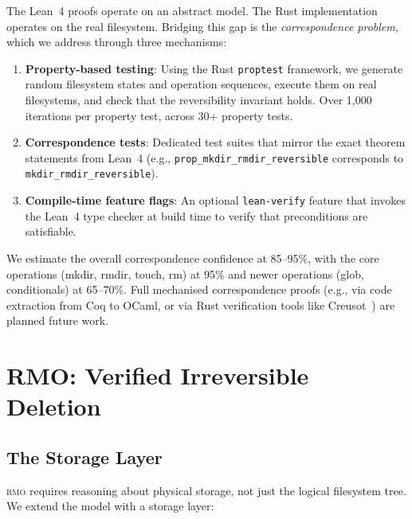 \documentclass[11pt,a4paper]{article}
\newcommand{\rmo}{\textsc{rmo}}
\newcommand{\lean}{Lean~4}
\begin{document}
The \lean{} proofs operate on an abstract model. The Rust implementation
operates on the real filesystem. Bridging this gap is the
\emph{correspondence problem}, which we address through three mechanisms:

\begin{enumerate}
  \item \textbf{Property-based testing}: Using the Rust \texttt{proptest}
        framework, we generate random filesystem states and operation sequences,
        execute them on real filesystems, and check that the reversibility
        invariant holds. Over 1,000 iterations per property test, across 30+
        property tests.

  \item \textbf{Correspondence tests}: Dedicated test suites that mirror the
        exact theorem statements from \lean{} (e.g.,
        \texttt{prop\_mkdir\_rmdir\_reversible} corresponds to
        \texttt{mkdir\_rmdir\_reversible}).

  \item \textbf{Compile-time feature flags}: An optional \texttt{lean-verify}
        feature that invokes the \lean{} type checker at build time to verify
        that preconditions are satisfiable.
\end{enumerate}

We estimate the overall correspondence confidence at 85--95\%, with the core
operations (mkdir, rmdir, touch, rm) at 95\% and newer operations (glob,
conditionals) at 65--70\%. Full mechanised correspondence proofs (e.g., via
code extraction from Coq to OCaml, or via Rust verification tools like
Creusot~\citep{denis2022}) are planned future work.

\section{RMO: Verified Irreversible Deletion}
\label{sec:rmo}

\subsection{The Storage Layer}

\rmo{} requires reasoning about physical storage, not just the logical
filesystem tree. We extend the model with a storage layer:
\end{document}
